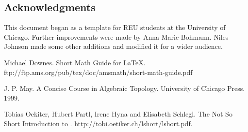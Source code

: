 \documentclass[11pt,oneside,draft]{amsart}
\begin{document}
\begin{center}
\end{center}


\subsection*{Acknowledgments}  

This document began as a template for REU students at the University
of Chicago.  Further improvements were made by Anna Marie Bohmann.
Niles Johnson made some other additions and modified it for a wider
audience.

\begin{thebibliography}{9}

Michael Downes.
Short Math Guide for \LaTeX.
ftp://ftp.ams.org/pub/tex/doc/amsmath/short-math-guide.pdf

J. P. May.
A Concise Course in Algebraic Topology.
University of Chicago Press. 1999. 

Tobias Oekiter, Hubert Partl, Irene Hyna and Elisabeth Schlegl.
The Not So Short Introduction to \LaTeXe.
http://tobi.oetiker.ch/lshort/lshort.pdf.

\end{thebibliography}
\end{document}
